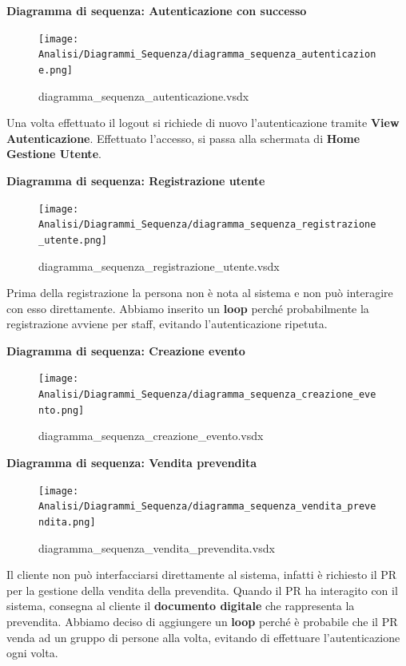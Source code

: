 \documentclass[a4paper]{article}
\begin{document}
\textbf{Diagramma di sequenza: Autenticazione con successo}

\begin{figure}[H]
    \texttt{[image: Analisi/Diagrammi\_Sequenza/diagramma\_sequenza\_autenticazione.png]}
    \centering
    \caption{diagramma\_sequenza\_autenticazione.vsdx}
\end{figure}

Una volta effettuato il logout si richiede di nuovo l'autenticazione tramite \textbf{View Autenticazione}. Effettuato l'accesso, si passa alla schermata di \textbf{Home Gestione Utente}.

\textbf{Diagramma di sequenza: Registrazione utente}

\begin{figure}[H]
    \texttt{[image: Analisi/Diagrammi\_Sequenza/diagramma\_sequenza\_registrazione\_utente.png]}
    \centering
    \caption{diagramma\_sequenza\_registrazione\_utente.vsdx}
\end{figure}

Prima della registrazione la persona non è nota al sistema e non può interagire con esso direttamente. Abbiamo inserito un \textbf{loop} perché probabilmente la registrazione avviene per staff, evitando l'autenticazione ripetuta.

\newpage

\textbf{Diagramma di sequenza: Creazione evento}

\begin{figure}[H]
    \texttt{[image: Analisi/Diagrammi\_Sequenza/diagramma\_sequenza\_creazione\_evento.png]}
    \centering
    \caption{diagramma\_sequenza\_creazione\_evento.vsdx}
\end{figure}

\textbf{Diagramma di sequenza: Vendita prevendita}

\begin{figure}[H]
    \texttt{[image: Analisi/Diagrammi\_Sequenza/diagramma\_sequenza\_vendita\_prevendita.png]}
    \centering
    \caption{diagramma\_sequenza\_vendita\_prevendita.vsdx}
\end{figure}

Il cliente non può interfacciarsi direttamente al sistema, infatti è richiesto il PR per la gestione della vendita della prevendita. Quando il PR ha interagito con il sistema, consegna al cliente il \textbf{documento digitale} che rappresenta la prevendita. Abbiamo deciso di aggiungere un \textbf{loop} perché è probabile che il PR venda ad un gruppo di persone alla volta, evitando di effettuare l'autenticazione ogni volta.
\end{document}
